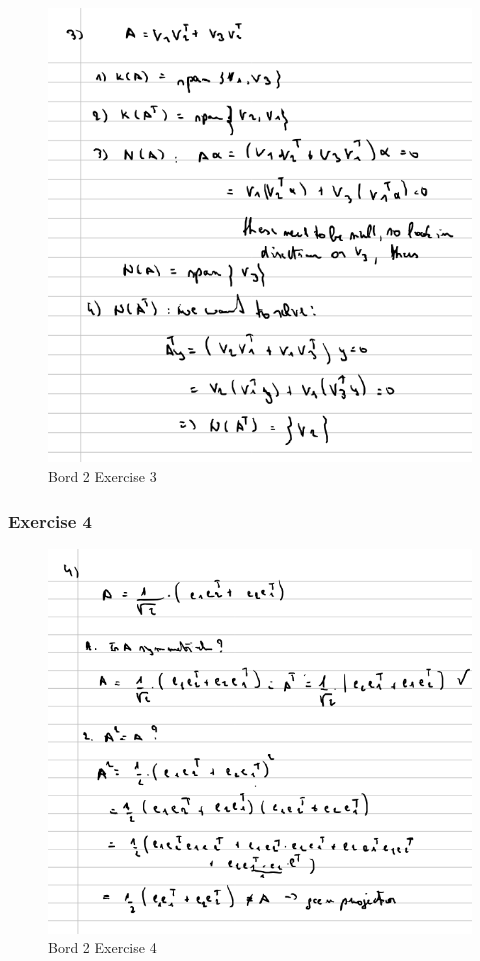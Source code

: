 \documentclass[a4paper]{report}
\begin{document}
\begin{figure}[H]
	\centering
	\includegraphics[width=\textwidth]{images/pl_2_ex_3.png}
	\caption{Bord 2 Exercise 3}
	\label{fig:bord_2_ex_3}
\end{figure}

\subsubsection{Exercise 4}

\begin{figure}[H]
	\centering
	\includegraphics[width=\textwidth]{images/pl_2_ex_4.png}
	\caption{Bord 2 Exercise 4}
	\label{fig:bord_2_ex_4}
\end{figure}
\end{document}
